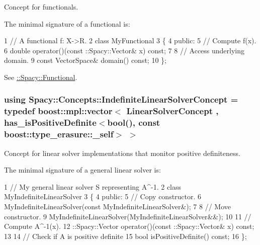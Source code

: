 Concept for functionals. 

\label{group__ConceptGroup_ga5273b50bd3e8c9a3f5a1e6b5f170836d_FunctionalConceptAnchor}%
\hypertarget{group__ConceptGroup_ga5273b50bd3e8c9a3f5a1e6b5f170836d_FunctionalConceptAnchor}{}%
The minimal signature of a functional is\+: 
\begin{DoxyCode}
1 // A functional f: X->R.
2 class MyFunctional
3 \{
4 public:
5   // Compute f(x).
6   double operator()(const ::Spacy::Vector& x) const;
7 
8   // Access underlying domain.
9   const VectorSpace& domain() const;
10 \};
\end{DoxyCode}


See \hyperlink{group__SpacyGroup_ga673218f603c93790864aef12c89d3a35_FunctionalAnchor}{\+:\+:Spacy\+:\+:Functional}. \hypertarget{group__ConceptGroup_ga582dd34334cdecc7b27883f4e8239490_ga582dd34334cdecc7b27883f4e8239490}{}
\subsubsection[{Indefinite\+Linear\+Solver\+Concept}]{\setlength{\rightskip}{0pt plus 5cm}using {\bf Spacy\+::\+Concepts\+::\+Indefinite\+Linear\+Solver\+Concept} = typedef boost\+::mpl\+::vector$<$ Linear\+Solver\+Concept , has\+\_\+is\+Positive\+Definite$<$bool(), const boost\+::type\+\_\+erasure\+::\+\_\+self$>$ $>$}\label{group__ConceptGroup_ga582dd34334cdecc7b27883f4e8239490_ga582dd34334cdecc7b27883f4e8239490}


Concept for linear solver implementations that monitor positive definiteness. 

\label{group__ConceptGroup_ga582dd34334cdecc7b27883f4e8239490_IndefiniteLinearSolverConceptAnchor}%
\hypertarget{group__ConceptGroup_ga582dd34334cdecc7b27883f4e8239490_IndefiniteLinearSolverConceptAnchor}{}%
The minimal signature of a general linear solver is\+: 
\begin{DoxyCode}
1 // My general linear solver S representing A^-1.
2 class MyIndefiniteLinearSolver
3 \{
4 public:
5   // Copy constructor.
6   MyIndefiniteLinearSolver(const MyIndefiniteLinearSolver&);
7 
8   // Move constructor.
9   MyIndefiniteLinearSolver(MyIndefiniteLinearSolver&&);
10 
11   // Compute A^-1(x).
12   ::Spacy::Vector operator()(const ::Spacy::Vector& x) const;
13 
14   // Check if A is positive definite
15   bool isPositiveDefinite() const;
16 \};
\end{DoxyCode}


